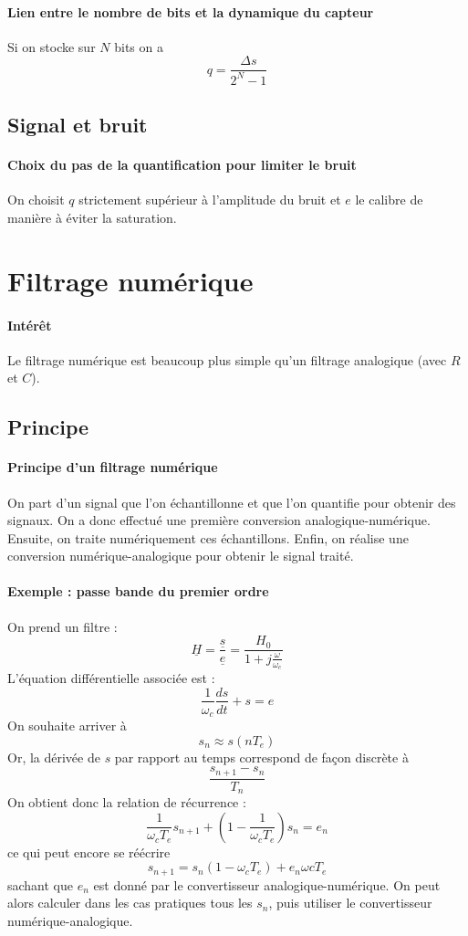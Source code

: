 \documentclass[french]{book}
\theoremstyle{plain}
\theoremstyle{definition}
\theoremstyle{remark}
\begin{document}
\paragraph{Lien entre le nombre de bits et la dynamique du capteur} Si on stocke sur $N$ bits on a $$q= \frac{\Delta s}{2^N-1}$$

\subsection{Signal et bruit}

\paragraph{Choix du pas de la quantification pour limiter le bruit} On choisit $q$ strictement supérieur à l'amplitude du bruit et $e$ le calibre de manière à éviter la saturation.

\section{Filtrage numérique}

\paragraph{Intérêt} Le filtrage numérique est beaucoup plus simple qu'un filtrage analogique (avec $R$ et $C$).

\subsection{Principe}

\paragraph{Principe d'un filtrage numérique} On part d'un signal que l'on échantillonne et que l'on quantifie pour obtenir des signaux. On a donc effectué une première conversion analogique-numérique. Ensuite, on traite numériquement ces échantillons. Enfin, on réalise une conversion numérique-analogique pour obtenir le signal traité.

\paragraph{Exemple : passe bande du premier ordre} On prend un filtre : $$\underline{H}=\frac{\underline{s}}{\underline{e}}=\frac{H_0}{1+j\frac{\omega}{\omega_c}}$$ L'équation différentielle associée est : $$\frac{1}{\omega_c}\frac{ds}{dt}+s=e$$ On souhaite arriver à $$s_n\approx s(nT_e)$$ Or, la dérivée de $s$ par rapport au temps correspond de façon discrète à $$\frac{s_{n+1}-s_n}{T_n}$$ On obtient donc la relation de récurrence : $$\frac{1}{\omega_c T_e}s_{n+1}+\left(1-\frac{1}{\omega_c T_e}\right)s_n=e_n$$ ce qui peut encore se réécrire $$s_{n+1}=s_n(1-\omega_c T_e)+e_n\omega c T_e$$ sachant que $e_n$ est donné par le convertisseur analogique-numérique. On peut alors calculer dans les cas pratiques tous les $s_n$, puis utiliser le convertisseur numérique-analogique.
\end{document}
